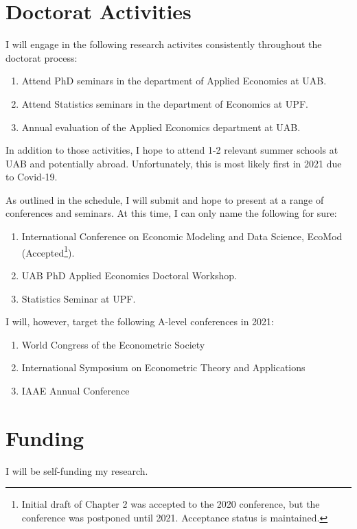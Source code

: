 \documentclass[a4paper,12pt]{article}
\begin{document}
\section{Doctorat Activities}

I will engage in the following research activites consistently throughout the doctorat process:

\begin{enumerate}
\item Attend PhD seminars in the department of Applied Economics at UAB.
\item Attend Statistics seminars in the department of Economics at UPF.
\item Annual evaluation of the Applied Economics department at UAB.
\end{enumerate}

In addition to those activities, I hope to attend 1-2 relevant summer schools at UAB and potentially abroad. Unfortunately, this is most likely first in 2021 due to Covid-19.

As outlined in the schedule, I will submit and hope to present at a range of conferences and seminars. At this time, I can only name the following for sure:

\begin{enumerate}
\item  International Conference on Economic Modeling and Data Science, EcoMod (Accepted\footnote{Initial draft of Chapter 2 was accepted to the 2020 conference, but the conference was postponed until 2021. Acceptance status is maintained.}).
\item UAB PhD Applied Economics Doctoral Workshop.
\item Statistics Seminar at UPF.
\end{enumerate}
%
I will, however, target the following A-level conferences in 2021:

\begin{enumerate}
\item World Congress of the Econometric Society
\item International Symposium on Econometric Theory and Applications
\item IAAE Annual Conference
\end{enumerate}

\section{Funding}

I will be self-funding my research.
\end{document}
